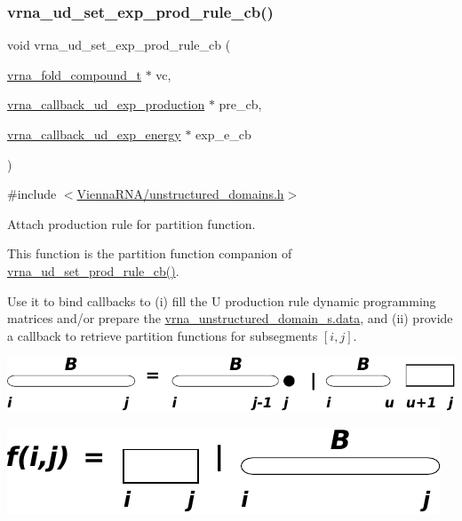 \subsubsection{\texorpdfstring{vrna\_ud\_set\_exp\_prod\_rule\_cb()}{vrna\_ud\_set\_exp\_prod\_rule\_cb()}}
{\footnotesize\ttfamily void vrna\+\_\+ud\+\_\+set\+\_\+exp\+\_\+prod\+\_\+rule\+\_\+cb (\begin{DoxyParamCaption}\item[{\mbox{\hyperlink{group__fold__compound_ga1b0cef17fd40466cef5968eaeeff6166}{vrna\+\_\+fold\+\_\+compound\+\_\+t}} $\ast$}]{vc,  }\item[{\mbox{\hyperlink{group__domains__up_ga33d78327dcd04c1ca5ab2887edc18c7b}{vrna\+\_\+callback\+\_\+ud\+\_\+exp\+\_\+production}} $\ast$}]{pre\+\_\+cb,  }\item[{\mbox{\hyperlink{group__domains__up_ga861706f257ba993753464b823e65b86e}{vrna\+\_\+callback\+\_\+ud\+\_\+exp\+\_\+energy}} $\ast$}]{exp\+\_\+e\+\_\+cb }\end{DoxyParamCaption})}



{\ttfamily \#include $<$\mbox{\hyperlink{unstructured__domains_8h}{Vienna\+R\+N\+A/unstructured\+\_\+domains.\+h}}$>$}



Attach production rule for partition function. 

This function is the partition function companion of \mbox{\hyperlink{group__domains__up_ga745a99f0bc72898d54de16f6e538828a}{vrna\+\_\+ud\+\_\+set\+\_\+prod\+\_\+rule\+\_\+cb()}}.

Use it to bind callbacks to (i) fill the {\ttfamily U} production rule dynamic programming matrices and/or prepare the \mbox{\hyperlink{group__domains__up_a8802b1b0512999a9f35202031811ce17}{vrna\+\_\+unstructured\+\_\+domain\+\_\+s.\+data}}, and (ii) provide a callback to retrieve partition functions for subsegments $ [i,j] $.

 
\begin{DoxyImageNoCaption}
  \mbox{\includegraphics[width=\textwidth,height=\textheight/2,keepaspectratio=true]{B_prod_rule}}
\end{DoxyImageNoCaption}


 
\begin{DoxyImageNoCaption}
  \mbox{\includegraphics[width=\textwidth,height=\textheight/2,keepaspectratio=true]{ligands_up_callback}}
\end{DoxyImageNoCaption}


